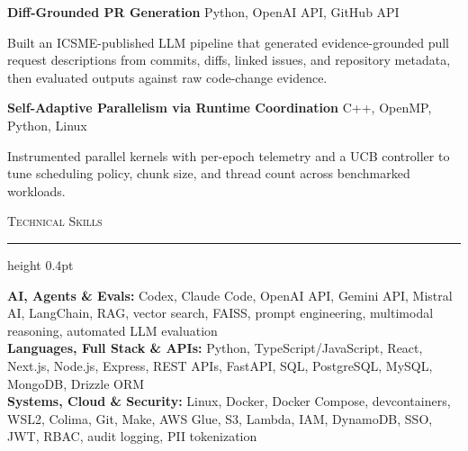 \documentclass[letterpaper,11pt]{article}
\newcommand{\resumesection}[1]{%
  \par\vspace{2pt}%
  {\large\scshape #1}\par\vspace{2pt}%
  \hrule height 0.4pt\vspace{2pt}%
}
\newcommand{\projectHeading}[2]{
  \textbf{#1} \hfill #2
}
\begin{document}
\projectHeading{Diff-Grounded PR Generation}{Python, OpenAI API, GitHub API}
\begin{tightitemize}
  \item Built an ICSME-published LLM pipeline that generated evidence-grounded pull request descriptions from commits, diffs, linked issues, and repository metadata, then evaluated outputs against raw code-change evidence.
\end{tightitemize}

\projectHeading{Self-Adaptive Parallelism via Runtime Coordination}{C++, OpenMP, Python, Linux}
\begin{tightitemize}
  \item Instrumented parallel kernels with per-epoch telemetry and a UCB controller to tune scheduling policy, chunk size, and thread count across benchmarked workloads.
\end{tightitemize}

\resumesection{Technical Skills}
\textbf{AI, Agents \& Evals:} Codex, Claude Code, OpenAI API, Gemini API, Mistral AI, LangChain, RAG, vector search, FAISS, prompt engineering, multimodal reasoning, automated LLM evaluation\\
\textbf{Languages, Full Stack \& APIs:} Python, TypeScript/JavaScript, React, Next.js, Node.js, Express, REST APIs, FastAPI, SQL, PostgreSQL, MySQL, MongoDB, Drizzle ORM\\
\textbf{Systems, Cloud \& Security:} Linux, Docker, Docker Compose, devcontainers, WSL2, Colima, Git, Make, AWS Glue, S3, Lambda, IAM, DynamoDB, SSO, JWT, RBAC, audit logging, PII tokenization
\end{document}
